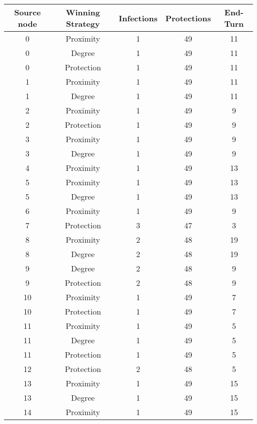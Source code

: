 \documentclass[results.tex]{subfiles}
\begin{document}
\begin{center}
  \begin{tabular}{| c || c | c | c | c |}
    \hline
    {\bfseries Source node} & {\bfseries Winning Strategy} & {\bfseries Infections} & {\bfseries Protections} & {\bfseries End-Turn} \\  %
    \hline\hline
    0 & Proximity & 1 & 49 & 11 \\ 
    \hline
    0 & Degree & 1 & 49 & 11 \\ 
    \hline
    0 & Protection & 1 & 49 & 11 \\ 
    \hline
    1 & Proximity & 1 & 49 & 11 \\ 
    \hline
    1 & Degree & 1 & 49 & 11 \\ 
    \hline
    2 & Proximity & 1 & 49 & 9 \\ 
    \hline
    2 & Protection & 1 & 49 & 9 \\ 
    \hline
    3 & Proximity & 1 & 49 & 9 \\ 
    \hline
    3 & Degree & 1 & 49 & 9 \\ 
    \hline
    4 & Proximity & 1 & 49 & 13 \\ 
    \hline
    5 & Proximity & 1 & 49 & 13 \\ 
    \hline
    5 & Degree & 1 & 49 & 13 \\ 
    \hline
    6 & Proximity & 1 & 49 & 9 \\ 
    \hline
    7 & Protection & 3 & 47 & 3 \\ 
    \hline
    8 & Proximity & 2 & 48 & 19 \\ 
    \hline
    8 & Degree & 2 & 48 & 19 \\ 
    \hline
    9 & Degree & 2 & 48 & 9 \\ 
    \hline
    9 & Protection & 2 & 48 & 9 \\ 
    \hline
    10 & Proximity & 1 & 49 & 7 \\ 
    \hline
    10 & Protection & 1 & 49 & 7 \\ 
    \hline
    11 & Proximity & 1 & 49 & 5 \\ 
    \hline
    11 & Degree & 1 & 49 & 5 \\ 
    \hline
    11 & Protection & 1 & 49 & 5 \\ 
    \hline
    12 & Protection & 2 & 48 & 5 \\ 
    \hline
    13 & Proximity & 1 & 49 & 15 \\ 
    \hline
    13 & Degree & 1 & 49 & 15 \\ 
    \hline
    14 & Proximity & 1 & 49 & 15 \\ 

\end{tabular}
\end{center}
\end{document}
